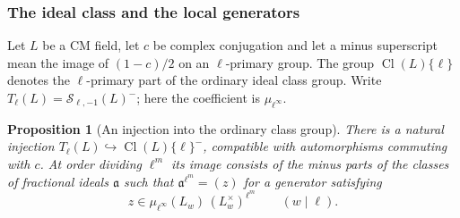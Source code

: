 \documentclass[a4paper,11pt]{article}
\newtheorem{proposition}{Proposition}[section]
\theoremstyle{definition}
\theoremstyle{remark}
\numberwithin{equation}{section}
\newcommand{\Sel}{\mathcal S}
\newcommand{\Cl}{\operatorname{Cl}}
\begin{document}
\subsubsection{The ideal class and the local generators}\label{nav:III-09}
Let \(L\) be a CM field, let \(c\) be complex conjugation and let a minus superscript mean the image of \((1-c)/2\) on an \(\ell\)-primary group. The group \(\Cl(L)\{\ell\}\) denotes the \(\ell\)-primary part of the ordinary ideal class group. Write \(T_\ell(L)=\Sel_{\ell,-1}(L)^-\); here the coefficient is \(\mu_{\ell^\infty}\).

\begin{proposition}[An injection into the ordinary class group]\label{prop:kummer30}
There is a natural injection \(T_\ell(L)\hookrightarrow\Cl(L)\{\ell\}^-\), compatible with automorphisms commuting with \(c\). At order dividing \(\ell^m\) its image consists of the minus parts of the classes of fractional ideals \(\mathfrak a\) such that \(\mathfrak a^{\ell^m}=(z)\) for a generator satisfying
\begin{equation}
 z\in \mu_{\ell^\infty}(L_w)\,(L_w^\times)^{\ell^m}
                     \qquad(w\mid\ell).                         \label{eq:local30}
\end{equation}
\end{proposition}
\end{document}
